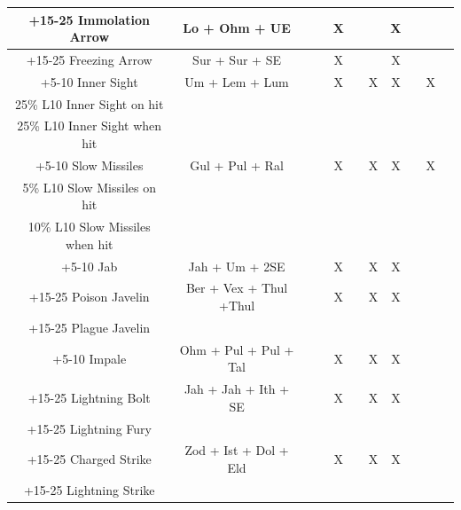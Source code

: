 \documentclass[12pt,a4paper]{article}
\begin{document}
\begin{center}
{\begin{tabular}{|c|c|c|c|c|c|c|c|c|c|c|}
+15-25 Immolation Arrow&Lo + Ohm + UE&&&X&&&X&&&\\
\hline
+15-25 Freezing Arrow&Sur + Sur + SE&&&X&&&X&&&\\
\hline
+5-10 Inner Sight&Um + Lem + Lum&&&X&&X&X&&X&\\
25\% L10 Inner Sight on hit&&&&&&&&&&\\
25\% L10 Inner Sight  when hit&&&&&&&&&&\\
\hline
+5-10 Slow Missiles&Gul + Pul + Ral&&&X&&X&X&&X&\\
5\% L10 Slow Missiles on hit&&&&&&&&&&\\
10\% L10 Slow Missiles when hit&&&&&&&&&&\\
\hline
+5-10 Jab&Jah + Um + 2SE&&&X&&X&X&&&\\
\hline
+15-25 Poison Javelin&Ber + Vex + Thul +Thul&&&X&&X&X&&&\\
+15-25 Plague Javelin&&&&&&&&&&\\
\hline
+5-10 Impale&Ohm + Pul + Pul + Tal&&&X&&X&X&&&\\
\hline
+15-25 Lightning Bolt&Jah + Jah + Ith + SE&&&X&&X&X&&&\\
+15-25 Lightning Fury&&&&&&&&&&\\
\hline
+15-25 Charged Strike&Zod + Ist + Dol + Eld&&&X&&X&X&&&\\
+15-25 Lightning Strike&&&&&&&&&&\\
\hline
\end{tabular}
}
\end{center}
\end{document}
